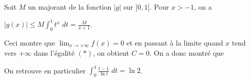 {{Soit $M$ un majorant de la fonction $|g|$ sur $]0,1[$. Pour $x>-1$, on a

\begin{center}
$|g(x)|\leqslant M\int_{0}^{1}t^x\;dt=\frac{M}{x+1}$.
\end{center}

Ceci montre que $\lim_{x \rightarrow +\infty}f(x)=0$ et en passant à la limite quand $x$ tend vers $+\infty$ dans l'égalité $(*)$, on obtient $C=0$. On a donc montré que

\begin{center}
\end{center}

On retrouve en particulier $\int_{0}^{1}\frac{t-1}{\ln t}\;dt=\ln2$.
}
}
